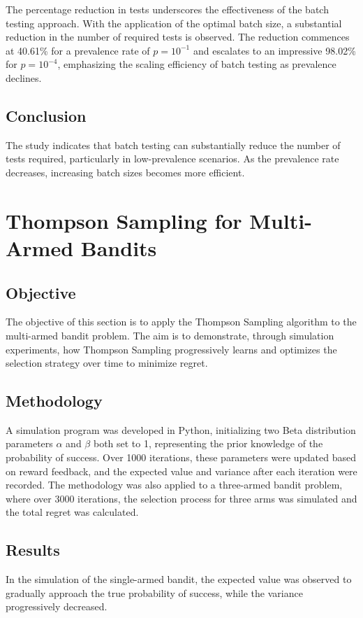 \documentclass[12pt]{article}
\begin{document}
The percentage reduction in tests underscores the effectiveness of the batch testing approach. With the application of the optimal batch size, a substantial reduction in the number of required tests is observed. The reduction commences at 40.61\% for a prevalence rate of \( p = 10^{-1} \) and escalates to an impressive 98.02\% for \( p = 10^{-4} \), emphasizing the scaling efficiency of batch testing as prevalence declines.

\subsection*{Conclusion}

The study indicates that batch testing can substantially reduce the number of tests required, particularly in low-prevalence scenarios. As the prevalence rate decreases, increasing batch sizes becomes more efficient. 

\section{Thompson Sampling for Multi-Armed Bandits}

\subsection{Objective}
The objective of this section is to apply the Thompson Sampling algorithm to the multi-armed bandit problem. The aim is to demonstrate, through simulation experiments, how Thompson Sampling progressively learns and optimizes the selection strategy over time to minimize regret.

\subsection{Methodology}
A simulation program was developed in Python, initializing two Beta distribution parameters \( \alpha \) and \( \beta \) both set to 1, representing the prior knowledge of the probability of success. Over 1000 iterations, these parameters were updated based on reward feedback, and the expected value and variance after each iteration were recorded. The methodology was also applied to a three-armed bandit problem, where over 3000 iterations, the selection process for three arms was simulated and the total regret was calculated.

\subsection{Results}
In the simulation of the single-armed bandit, the expected value was observed to gradually approach the true probability of success, while the variance progressively decreased. 
\end{document}
